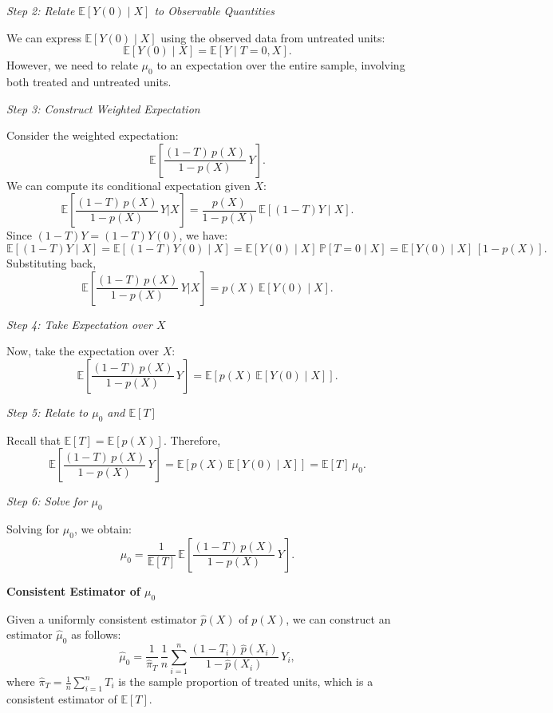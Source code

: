 \documentclass{article}
\begin{document}
\textit{Step 2: Relate \(\mathbb{E}[Y(0) \mid X]\) to Observable Quantities}

We can express \(\mathbb{E}[Y(0) \mid X]\) using the observed data from untreated units:
\[
\mathbb{E}[Y(0) \mid X] = \mathbb{E}[Y \mid T = 0, X].
\]
However, we need to relate \(\mu_0\) to an expectation over the entire sample, involving both treated and untreated units.

\textit{Step 3: Construct Weighted Expectation}

Consider the weighted expectation:
\[
\mathbb{E}\left[ \frac{(1 - T) \, p(X)}{1 - p(X)} \, Y \right].
\]
We can compute its conditional expectation given \(X\):
\[
\mathbb{E}\left[ \frac{(1 - T) \, p(X)}{1 - p(X)} \, Y \Big| X \right] = \frac{p(X)}{1 - p(X)} \, \mathbb{E}\left[ (1 - T) Y \mid X \right].
\]
Since \( (1 - T) Y = (1 - T) Y(0) \), we have:
\[
\mathbb{E}\left[ (1 - T) Y \mid X \right] = \mathbb{E}[ (1 - T) Y(0) \mid X ] = \mathbb{E}[ Y(0) \mid X ] \, \mathbb{P}[ T = 0 \mid X ] = \mathbb{E}[ Y(0) \mid X ] \, [1 - p(X)].
\]
Substituting back,
\[
\mathbb{E}\left[ \frac{(1 - T) \, p(X)}{1 - p(X)} \, Y \Big| X \right] = p(X) \, \mathbb{E}[ Y(0) \mid X ].
\]

\textit{Step 4: Take Expectation over \(X\)}

Now, take the expectation over \(X\):
\[
\mathbb{E}\left[ \frac{(1 - T) \, p(X)}{1 - p(X)} \, Y \right] = \mathbb{E}\left[ p(X) \, \mathbb{E}[ Y(0) \mid X ] \right].
\]

\textit{Step 5: Relate to \(\mu_0\) and \(\mathbb{E}[T]\)}

Recall that \(\mathbb{E}[T] = \mathbb{E}[ p(X) ]\). Therefore,
\[
\mathbb{E}\left[ \frac{(1 - T) \, p(X)}{1 - p(X)} \, Y \right] = \mathbb{E}[ p(X) \, \mathbb{E}[ Y(0) \mid X ] ] = \mathbb{E}[T] \, \mu_0.
\]

\textit{Step 6: Solve for \(\mu_0\)}

Solving for \(\mu_0\), we obtain:
\[
\mu_0 = \frac{1}{\mathbb{E}[T]} \, \mathbb{E}\left[ \frac{(1 - T) \, p(X)}{1 - p(X)} \, Y \right].
\]

\textbf{Consistent Estimator of \(\mu_0\)}

Given a uniformly consistent estimator \(\hat{p}(X)\) of \( p(X) \), we can construct an estimator \(\hat{\mu}_0\) as follows:
\[
\hat{\mu}_0 = \frac{1}{\hat{\pi}_T} \, \frac{1}{n} \sum_{i=1}^n \frac{(1 - T_i) \, \hat{p}(X_i)}{1 - \hat{p}(X_i)} \, Y_i,
\]
where \(\hat{\pi}_T = \frac{1}{n} \sum_{i=1}^n T_i\) is the sample proportion of treated units, which is a consistent estimator of \(\mathbb{E}[T]\).
\end{document}
